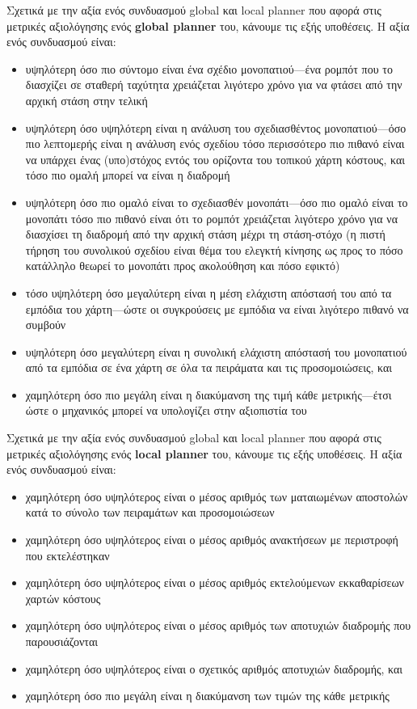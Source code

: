 Σχετικά με την αξία ενός συνδυασμού global και local planner που αφορά στις
μετρικές αξιολόγησης ενός \textbf{global planner} του, κάνουμε τις εξής
υποθέσεις. Η αξία ενός συνδυασμού είναι:
\begin{itemize}
  \item υψηλότερη όσο πιο σύντομο είναι ένα σχέδιο μονοπατιού---ένα ρομπότ που
        το διασχίζει σε σταθερή ταχύτητα χρειάζεται λιγότερο χρόνο για να φτάσει
        από την αρχική στάση στην τελική
  \item υψηλότερη όσο υψηλότερη είναι η ανάλυση του σχεδιασθέντος
        μονοπατιού---όσο πιο λεπτομερής είναι η ανάλυση ενός σχεδίου τόσο
        περισσότερο πιο πιθανό είναι να υπάρχει ένας (υπο)στόχος εντός του
        ορίζοντα του τοπικού χάρτη κόστους, και τόσο πιο ομαλή μπορεί να είναι
        η διαδρομή
  \item υψηλότερη όσο πιο ομαλό είναι το σχεδιασθέν μονοπάτι---όσο πιο ομαλό
        είναι το μονοπάτι τόσο πιο πιθανό είναι ότι το ρομπότ χρειάζεται
        λιγότερο χρόνο για να διασχίσει τη διαδρομή από την αρχική στάση μέχρι
        τη στάση-στόχο (η πιστή τήρηση του συνολικού σχεδίου είναι θέμα του
        ελεγκτή κίνησης ως προς το πόσο κατάλληλο θεωρεί το μονοπάτι προς
        ακολούθηση και πόσο εφικτό)
  \item τόσο υψηλότερη όσο μεγαλύτερη είναι η μέση ελάχιστη απόστασή του από τα
        εμπόδια του χάρτη---ώστε οι συγκρούσεις με εμπόδια να είναι λιγότερο
        πιθανό να συμβούν
  \item υψηλότερη όσο μεγαλύτερη είναι η συνολική ελάχιστη απόστασή του
        μονοπατιού από τα εμπόδια σε ένα χάρτη σε όλα τα πειράματα και τις
        προσομοιώσεις, και
  \item χαμηλότερη όσο πιο μεγάλη είναι η διακύμανση της τιμή κάθε
        μετρικής---έτσι ώστε ο μηχανικός μπορεί να υπολογίζει στην αξιοπιστία
        του
\end{itemize}


Σχετικά με την αξία ενός συνδυασμού global και local planner που αφορά στις
μετρικές αξιολόγησης ενός \textbf{local planner} του, κάνουμε τις εξής
υποθέσεις. Η αξία ενός συνδυασμού είναι:

\begin{itemize}
  \item χαμηλότερη όσο υψηλότερος είναι ο μέσος αριθμός των ματαιωμένων
        αποστολών κατά το σύνολο των πειραμάτων και προσομοιώσεων
  \item χαμηλότερη όσο υψηλότερος είναι ο μέσος αριθμός ανακτήσεων με περιστροφή
        που εκτελέστηκαν
  \item χαμηλότερη όσο υψηλότερος είναι ο μέσος αριθμός εκτελούμενων
        εκκαθαρίσεων χαρτών κόστους
  \item χαμηλότερη όσο υψηλότερος είναι ο μέσος αριθμός των αποτυχιών διαδρομής
        που παρουσιάζονται
  \item χαμηλότερη όσο υψηλότερος είναι ο σχετικός αριθμός αποτυχιών διαδρομής,
        και
  \item χαμηλότερη όσο πιο μεγάλη είναι η διακύμανση των τιμών της κάθε μετρικής
\end{itemize}


